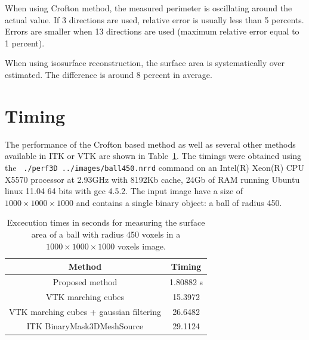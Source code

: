 \documentclass{InsightArticle}
\begin{document}
When using Crofton method, the measured perimeter is oscillating around the actual value.
If 3 directions are used, relative error is usually less than 5 percents.
Errors are smaller when 13 directions are used (maximum relative error equal to 1 percent).

When using isosurface reconstruction, the surface area is systematically over estimated.
The difference is around 8 percent in average.


\section{Timing}

The performance of the Crofton based method as well as several other methods available in ITK or VTK
are shown in Table~\ref{tab:perf}. The timings were obtained using the {\tt
./perf3D ../images/ball450.nrrd} command on an Intel(R) Xeon(R) CPU X5570 processor at 2.93GHz
with 8192Kb cache, 24Gb of RAM running Ubuntu linux 11.04 64 bits with gcc 4.5.2.
The input image have a size of $1000 \times 1000 \times 1000$ and contains a single binary object:
a ball of radius 450.


\begin{table}[!htb]
\begin{center}\begin{tabular}{cc}
Method                                   & Timing \\
 \hline 
 \hline
Proposed method                          & 1.80882 s \\
VTK marching cubes                       & 15.3972  \\
VTK marching cubes + gaussian filtering  & 26.6482 \\
ITK BinaryMask3DMeshSource               & 29.1124 \\
 \hline
\end{tabular}\end{center}
\caption{ \label{tab:perf} 
Excecution times in seconds for measuring the surface area of a ball with radius 450 voxels in a
$1000\times 1000 \times 1000$ voxels image.
}
\end{table}


\appendix





\nocite{ITKSoftwareGuide}
\end{document}
